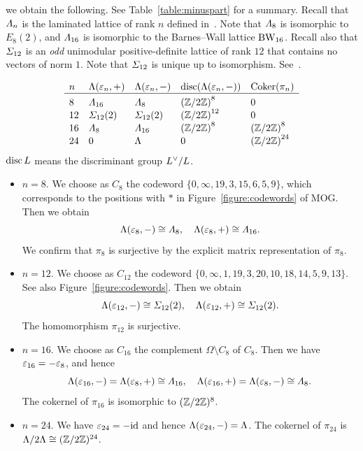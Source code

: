 \documentclass{amsart} %
\begin{document}
 we obtain the following.
 See Table~\ref{table:minuspart} for a summary.
 Recall that $\varLambda_{n}$ is 
 the laminated lattice of rank $n$
 defined in~\cite[Figure 6.2]{theCSbook}.
 Note that $\varLambda_8$
is isomorphic to $E_8(2)$,
and $\varLambda_{16}$ is 
isomorphic to the Barnes--Wall lattice $\mathrm{BW}_{16}$.
 Recall also that
$\varSigma_{12}$ is an \emph{odd} unimodular positive-definite lattice of rank $12$
that contains no vectors of norm $1$.
Note that $\varSigma_{12}$ is unique up to isomorphism.
See~\cite[Table 16.7]{theCSbook}.
%
\begin{table}
\[
\begin{array}{lllll}
n & \Leech(\vep_n, +)& \Leech(\vep_n, -) & \disc(\Leech(\vep_n, -)) & \Coker (\pi_n) \\
\hline
8 & \Lamsxtn & \Laminated_{8} & {(\ZZ/2\ZZ)}^{8\;\;} & 0 \mystruth{12pt}\\
12 & \Sigmatwlv(2) & \Sigmatwlv(2) & {(\ZZ/2\ZZ)}^{12} & 0 \\
16 & \Laminated_{8} & \Lamsxtn & {(\ZZ/2\ZZ)}^{8\;\;} &{(\ZZ/2\ZZ)}^{8\;\;} \\
24& 0 & \Leech &0 &{(\ZZ/2\ZZ)}^{24} \\
\end{array}
\]
{\small 
$\operatorname{disc} L$ means the discriminant group $L^{\vee}/L$.\phantom{aaaa}}
\smallskip
\caption{$\Leech(\vep_n, +)$ and $\Leech(\vep_n, -)$}\label{table:minuspart}
\end{table}
%
\begin{itemize}
%
\item $n=8$. 
We choose as $C_{8}$ the codeword 
$\{ 0,\infty, 19, 3, 15, 6, 5, 9\} $, 
which corresponds to 
the positions with $*$ in Figure~\ref{figure:codewords} of MOG.
Then we obtain 
\[
\Lambda(\varepsilon_8, -)\cong \varLambda_{8},
\quad 
\Lambda(\varepsilon_8, +)\cong \varLambda_{16}.
\]
We confirm  that 
 $\pi_{8}$ is surjective
by the explicit matrix representation of $\pi_8$.
%
\item $n=12$. 
We choose as $C_{12}$ the codeword 
$\{ 0,\infty, 1,19, 3, 20,10, 18, 14, 5, 9, 13\}$.
See also Figure~\ref{figure:codewords}.
Then we obtain 
\[
\Lambda(\varepsilon_{12}, -)\cong \varSigma_{12}(2),
\quad 
\Lambda(\varepsilon_{12}, +)\cong \varSigma_{12}(2).
\]
The homomorphism $\pi_{12}$ is surjective.
%
\item $n=16$. 
We choose as $C_{16}$ the complement $\Omega\setminus C_8$ of $C_8$. 
Then we have $\varepsilon_{16}=-\varepsilon_{8}$, and hence 
\[
\Lambda(\varepsilon_{16}, -)=\Lambda(\varepsilon_{8}, +)\cong \varLambda_{16},
\quad 
\Lambda(\varepsilon_{16}, +)=\Lambda(\varepsilon_8, -)\cong \varLambda_{8}.
\]
%
The cokernel of $\pi_{16}$ is isomorphic to $(\mathord{\mathbb{Z}}/2\mathord{\mathbb{Z}})^8$.
%
\item $n=24$. We have $\varepsilon_{24}=-\mathord{\mathrm{id}}$ and hence 
$\Lambda(\varepsilon_{24}, -)=\Lambda$.
The cokernel of $\pi_{24}$ is $\Lambda/2\Lambda \cong (\mathord{\mathbb{Z}}/2\mathord{\mathbb{Z}})^{24}$.
\end{itemize}
\end{document}
